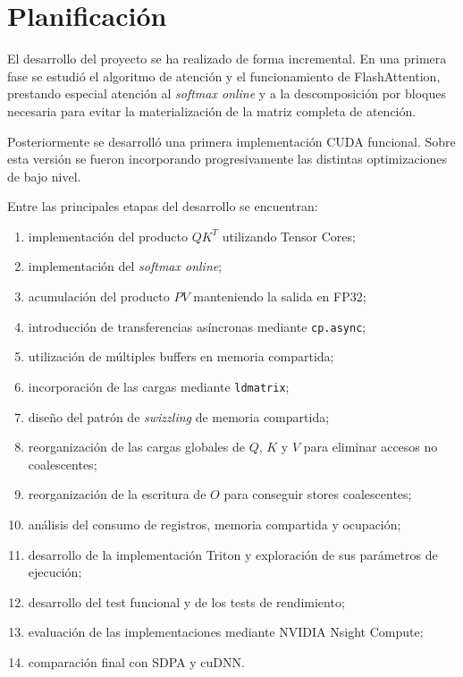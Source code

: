 \section{Planificación}

El desarrollo del proyecto se ha realizado de forma incremental. En una primera fase se estudió el algoritmo de atención y el funcionamiento de FlashAttention, prestando especial atención al \textit{softmax online} y a la descomposición por bloques necesaria para evitar la materialización de la matriz completa de atención.

Posteriormente se desarrolló una primera implementación CUDA funcional. Sobre esta versión se fueron incorporando progresivamente las distintas optimizaciones de bajo nivel.

Entre las principales etapas del desarrollo se encuentran:

\begin{enumerate}

\item implementación del producto \(QK^T\) utilizando Tensor Cores;

\item implementación del \textit{softmax online};

\item acumulación del producto \(PV\) manteniendo la salida en FP32;

\item introducción de transferencias asíncronas mediante \texttt{cp.async};

\item utilización de múltiples buffers en memoria compartida;

\item incorporación de las cargas mediante \texttt{ldmatrix};

\item diseño del patrón de \textit{swizzling} de memoria compartida;

\item reorganización de las cargas globales de \(Q\), \(K\) y \(V\) para eliminar accesos no coalescentes;

\item reorganización de la escritura de \(O\) para conseguir stores coalescentes;

\item análisis del consumo de registros, memoria compartida y ocupación;

\item desarrollo de la implementación Triton y exploración de sus parámetros de ejecución;

\item desarrollo del test funcional y de los tests de rendimiento;

\item evaluación de las implementaciones mediante NVIDIA Nsight Compute;

\item comparación final con SDPA y cuDNN.

\end{enumerate}

